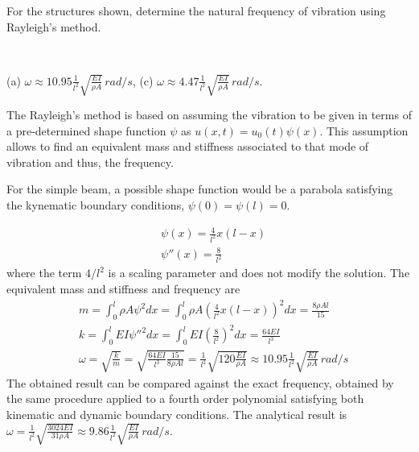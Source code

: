 
\begin{Exercise}[label={rayleigh_sdof}]
For the structures shown, determine the natural frequency of vibration using Rayleigh's method.

\begin{center}
     \\
\end{center}

\shortAnswer (a) $\omega \approx 10.95\frac{1}{l^2}\sqrt{\frac{EI}{\rho A}}\,\si{rad/s}$, (c) $\omega \approx 4.47\frac{1}{l^2}\sqrt{\frac{EI}{\rho A}}\,\si{rad/s}$.
\end{Exercise}


\begin{Answer}[ref={rayleigh_sdof}]
The Rayleigh's method is based on assuming the vibration to be given in terms of a pre-determined shape function $\psi$ as $u(x,t) = u_0(t)\psi(x)$. This assumption allows to find an equivalent mass and stiffness associated to that mode of vibration and thus, the frequency.

\parbox{.7\textwidth}{For the simple beam, a possible shape function would be a parabola satisfying the kynematic boundary conditions, $\psi(0) = \psi(l) = 0$.} \hspace{1em}
\parbox{.25\textwidth}{}
\begin{align*}
&\psi(x) = \frac{4}{l^2} x (l-x) \\
&\psi''(x) = \frac{8}{l^2}
\end{align*}
where the term $4/l^2$ is a scaling parameter and does not modify the solution. The equivalent mass and stiffness and frequency are
\begin{align*}
&m = \int_0^l \rho A\psi^2dx = \int_0^l \rho A \left(\frac{4}{l^2} x (l-x)\right)^2dx = \frac{8\rho Al}{15} \\
&k = \int_0^l EI \psi''^2 dx = \int_0^l EI \left(\frac{8}{l^2}\right)^2dx = \frac{64EI}{l^3} \\
&\omega = \sqrt{\frac{k}{m}} = \sqrt{\frac{64EI}{l^3}\frac{15}{8\rho Al}} = \frac{1}{l^2}\sqrt{120\frac{EI}{\rho A}} \approx 10.95\frac{1}{l^2}\sqrt{\frac{EI}{\rho A}}\,\si{rad/s}
\end{align*}
The obtained result can be compared against the exact frequency, obtained by the same procedure applied to a fourth order polynomial satisfying both kinematic and dynamic boundary conditions. The analytical result is $\omega = \frac{1}{l^2}\sqrt{\frac{3024EI}{31\rho A}} \approx 9.86\frac{1}{l^2}\sqrt{\frac{EI}{\rho A}}\,\si{rad/s}$.


\end{Answer}
